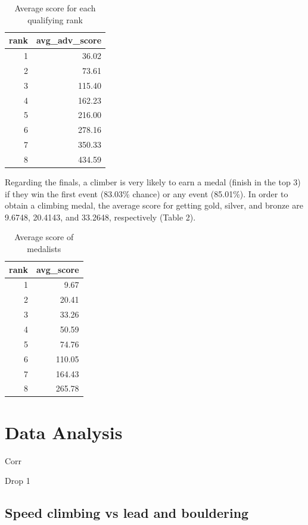 \documentclass[12pt]{article}
\begin{document}
\begin{table}[ht]
\centering
\caption{Average score for each qualifying rank} 
\begin{tabular}{rr}
  \hline
rank & avg\_adv\_score \\ 
  \hline
  1 & 36.02 \\ 
    2 & 73.61 \\ 
    3 & 115.40 \\ 
    4 & 162.23 \\ 
    5 & 216.00 \\ 
    6 & 278.16 \\ 
    7 & 350.33 \\ 
    8 & 434.59 \\ 
   \hline
\end{tabular}
\end{table}

Regarding the finals, a climber is very likely to earn a medal (finish
in the top 3) if they win the first event (83.03\% chance) or any event
(85.01\%). In order to obtain a climbing medal, the average score for
getting gold, silver, and bronze are 9.6748, 20.4143, and 33.2648,
respectively (Table 2).

\begin{table}[ht]
\centering
\caption{Average score of medalists} 
\begin{tabular}{rr}
  \hline
rank & avg\_score \\ 
  \hline
  1 & 9.67 \\ 
    2 & 20.41 \\ 
    3 & 33.26 \\ 
    4 & 50.59 \\ 
    5 & 74.76 \\ 
    6 & 110.05 \\ 
    7 & 164.43 \\ 
    8 & 265.78 \\ 
   \hline
\end{tabular}
\end{table}

\hypertarget{data-analysis}{%
\section{Data Analysis}\label{data-analysis}}

Corr

Drop 1

\hypertarget{speed-climbing-vs-lead-and-bouldering}{%
\subsection{Speed climbing vs lead and
bouldering}\label{speed-climbing-vs-lead-and-bouldering}}
\end{document}
